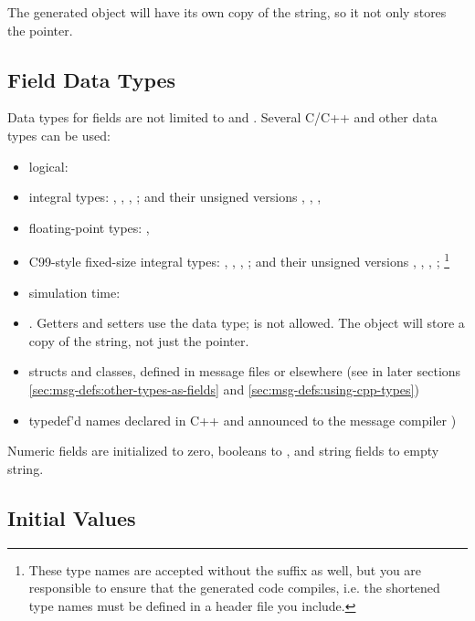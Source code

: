 The generated object will have its own copy of the string, so it not only stores
the  pointer.


\subsection{Field Data Types}
\label{sec:msg-defs:field-data-types}

Data types for fields are not limited to  and
. Several C/C++ and other data types can be used:

\begin{itemize}
   \item logical: 
   \item integral types: , , ,
      ; and their unsigned versions ,
      , , 
   \item floating-point types: , 
   \item C99-style fixed-size integral types: , ,
      , ; and their unsigned versions
      , , , ;
      \footnote{These type names are accepted without the  suffix as well,
      but you are responsible to ensure that the generated code compiles, i.e. the
      shortened type names must be defined in a header file you include.}
   \item {\opp} simulation time: 
   \item {}. Getters and setters use the  data type;
       is not allowed. The object will store a copy of the string,
      not just the pointer.
   \item structs and classes, defined in message files or elsewhere (see
      in later sections \ref{sec:msg-defs:other-types-as-fields}
      and \ref{sec:msg-defs:using-cpp-types})
   \item typedef'd names declared in C++ and announced to the message compiler
)
\end{itemize}

Numeric fields are initialized to zero, booleans to , and string
fields to empty string.


\subsection{Initial Values}
\label{sec:msg-defs:initial-values}

